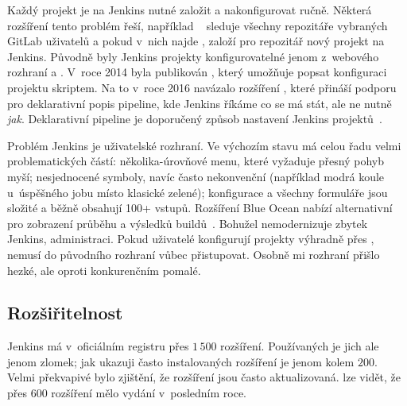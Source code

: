         Každý projekt je na Jenkins nutné založit a nakonfigurovat ručně. Některá rozšíření tento problém řeší, například ~\cite{jenkins-plugins-gbs} sleduje všechny repozitáře vybraných GitLab uživatelů a pokud v~nich najde , založí pro repozitář nový projekt na Jenkins. Původně byly Jenkins projekty konfigurovatelné jenom z~webového rozhraní a . V~roce 2014 byla publikován , který umožňuje popsat konfiguraci projektu skriptem. Na to v~roce 2016 navázalo rozšíření , které přináší podporu pro deklarativní popis pipeline, kde Jenkins říkáme co se má stát, ale ne nutně \textit{jak}. Deklarativní pipeline je doporučený způsob nastavení Jenkins projektů~\cite{jenkins-best-practices}.

        Problém Jenkins je uživatelské rozhraní. Ve výchozím stavu má  celou řadu velmi problematických částí: několika-úrovňové menu, které vyžaduje přesný pohyb myší; nesjednocené symboly, navíc často nekonvenční (například modrá koule u~úspěšného jobu místo klasické zelené); konfigurace a všechny formuláře jsou složité a běžně obsahují 100+ vstupů. Rozšíření Blue Ocean nabízí alternativní  pro zobrazení průběhu a výsledků buildů~\cite{jenkins-plugin-blueocean}. Bohužel nemodernizuje zbytek Jenkins, administraci. Pokud uživatelé konfigurují projekty výhradně přes , nemusí do původního rozhraní vůbec přistupovat. Osobně mi rozhraní přišlo hezké, ale oproti konkurenčním \CICD pomalé.

    \subsection{Rozšiřitelnost}
        Jenkins má v~oficiálním registru přes $1\,500$ rozšíření. Používaných je jich ale jenom zlomek; jak ukazuji  často instalovaných rozšíření je jenom kolem $200$. Velmi překvapivé bylo zjištění, že rozšíření jsou často aktualizovaná.  lze vidět, že přes $600$ rozšíření mělo vydání v~posledním roce.

